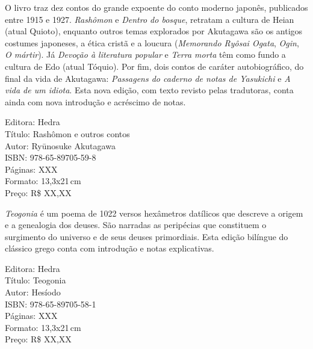\pagebreak


\noindent{}O livro traz dez contos do grande expoente do conto moderno japonês, publicados entre 1915 e 1927. \textit{Rashômon} e \textit{Dentro do bosque}, retratam a cultura de Heian (atual Quioto), enquanto outros temas explorados por Akutagawa são os antigos costumes japoneses, a ética cristã e a loucura (\textit{Memorando Ryôsai Ogata}, \textit{Ogin}, \textit{O mártir}). Já \textit{Devoção à literatura popular} e \textit{Terra morta} têm como fundo a cultura de Edo (atual Tóquio). Por fim, dois contos de caráter autobiográfico, do final da vida de Akutagawa: \textit{Passagens do caderno de notas de Yasukichi} e \textit{A vida de um idiota}. Esta nova edição, com texto revisto pelas tradutoras, conta ainda com nova introdução e acréscimo de notas.

\begin{ficha}
Editora: Hedra\\
Título: Rashômon e outros contos\\
Autor: Ryūnosuke Akutagawa\\ 
ISBN: 978-65-89705-59-8\\
Páginas: XXX\\
Formato: 13,3x21\,cm\\
Preço: R\$ XX,XX\\
\end{ficha}

\pagebreak


\noindent{}\textit{Teogonia} é um poema de 1022 versos hexâmetros datílicos que descreve a origem e a genealogia dos deuses. São narradas as peripécias que constituem o surgimento do universo e de seus deuses primordiais. Esta edição bilíngue do clássico grego conta com introdução e notas explicativas.

\begin{ficha}
Editora: Hedra\\
Título: Teogonia\\
Autor: Hesíodo\\ 
ISBN: 978-65-89705-58-1\\
Páginas: XXX\\
Formato: 13,3x21\,cm\\
Preço: R\$ XX,XX\\
\end{ficha}

\pagebreak


